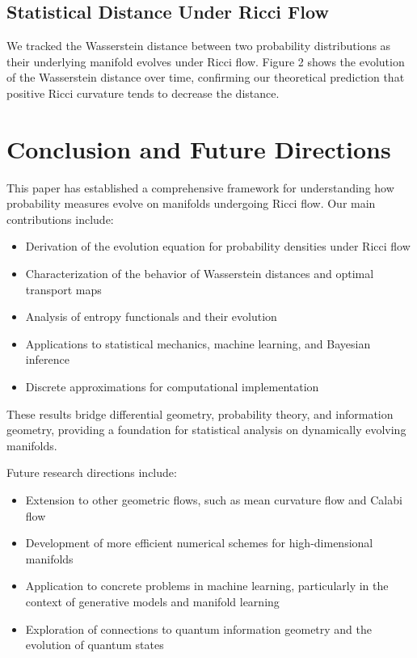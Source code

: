 \documentclass[12pt,a4paper]{article}
\begin{document}
\subsection{Statistical Distance Under Ricci Flow}

We tracked the Wasserstein distance between two probability distributions as their underlying manifold evolves under Ricci flow. Figure 2 shows the evolution of the Wasserstein distance over time, confirming our theoretical prediction that positive Ricci curvature tends to decrease the distance.

\section{Conclusion and Future Directions}

This paper has established a comprehensive framework for understanding how probability measures evolve on manifolds undergoing Ricci flow. Our main contributions include:

\begin{itemize}
    \item Derivation of the evolution equation for probability densities under Ricci flow
    \item Characterization of the behavior of Wasserstein distances and optimal transport maps
    \item Analysis of entropy functionals and their evolution
    \item Applications to statistical mechanics, machine learning, and Bayesian inference
    \item Discrete approximations for computational implementation
\end{itemize}

These results bridge differential geometry, probability theory, and information geometry, providing a foundation for statistical analysis on dynamically evolving manifolds.

Future research directions include:
\begin{itemize}
    \item Extension to other geometric flows, such as mean curvature flow and Calabi flow
    \item Development of more efficient numerical schemes for high-dimensional manifolds
    \item Application to concrete problems in machine learning, particularly in the context of generative models and manifold learning
    \item Exploration of connections to quantum information geometry and the evolution of quantum states
\end{itemize}
\end{document}
